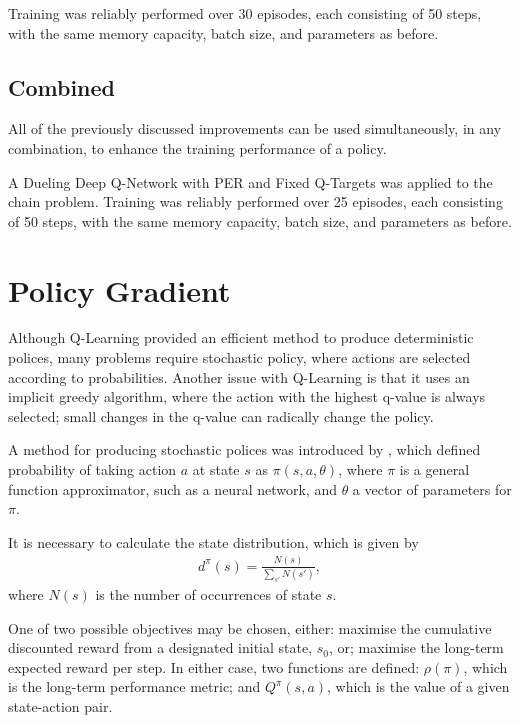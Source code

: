 Training was reliably performed over 30 episodes, each consisting of 50 steps,
with the same memory capacity, batch size, and parameters as before.



\subsection{Combined}

All of the previously discussed improvements can be used simultaneously, in any
combination, to enhance the training performance of a policy.

A Dueling Deep Q-Network with PER and Fixed Q-Targets was applied to the chain
problem.
Training was reliably performed over 25 episodes, each consisting of 50 steps,
with the same memory capacity, batch size, and parameters as before.



\section{Policy Gradient}

Although Q-Learning provided an efficient method to produce deterministic
polices, many problems require stochastic policy, where actions are selected
according to probabilities.
Another issue with Q-Learning is that it uses an implicit greedy algorithm,
where the action with the highest q-value is always selected; small changes in
the q-value can radically change the policy.

A method for producing stochastic polices was introduced by
\cite{Sutton:2000:Policy}, which defined probability of taking action $a$ at
state $s$ as $\pi(s,a,\theta)$, where $\pi$ is a general function approximator,
such as a neural network, and $\theta$ a vector of parameters for $\pi$.

It is necessary to calculate the state distribution, which is given by
\begin{align*}
    d^\pi(s) = \frac{N(s)}{\sum_{s'} N(s')},
\end{align*}
where $N(s)$ is the number of occurrences of state $s$.

One of two possible objectives may be chosen, either:
maximise the cumulative discounted reward from a designated initial state,
$s_0$, or;
maximise the long-term expected reward per step.
In either case, two functions are defined:
$\rho(\pi)$, which is the long-term performance metric;
and $Q^\pi(s,a)$, which is the value of a given state-action pair.

